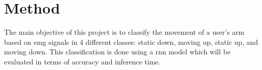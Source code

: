 \section{Method}
\label{section:method}



The main objective of this project is to classify the movement of a user's arm based on \acrshort{emg} signals in
4 different classes: static down, moving up, static up, and moving down. This classification is done using a \acrshort{rnn} model
which will be evaluated in terms of accuracy and inference time.

